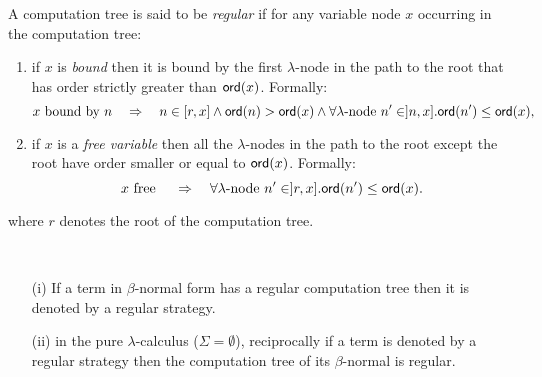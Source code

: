 \begin{dfn}
A computation tree is said to be \emph{regular} if
for any variable node $x$ occurring in the computation tree:
\begin{enumerate}
\item if $x$ is \emph{bound} then it is bound by the first $\lambda$-node in the path to the root that has
order strictly greater than ${\sf ord}(x)$. Formally:
$$ x \mbox{ bound by } n \quad \Rightarrow \quad n \in [r,x] \wedge {\sf ord}(n) > {\sf ord}(x) \wedge \forall \lambda\mbox{-node } n' \in ]n,x] . {\sf ord}(n') \leq {\sf ord}(x),$$

\item if $x$ is a \emph{free variable} then all the $\lambda$-nodes in the path to the root except the root have order
smaller or equal to ${\sf ord}(x)$. Formally:
$$ x \mbox{ free } \quad \Rightarrow \quad  \forall \lambda\mbox{-node } n' \in ]r,x] . {\sf ord}(n') \leq {\sf ord}(x). $$
\end{enumerate}
where $r$ denotes the root of the computation tree.
\end{dfn}



\begin{prop} \
\label{prop:regular_comp_imp_regular_strat}
\begin{enumerate}
\item[(i)] If a term in $\beta$-normal form has a regular computation tree then it is denoted by a regular strategy.
\item[(ii)] in the pure $\lambda$-calculus ($\Sigma=\emptyset$), reciprocally if a term is denoted by a regular strategy then
the computation tree of its $\beta$-normal is regular.
\end{enumerate}
\end{prop}

